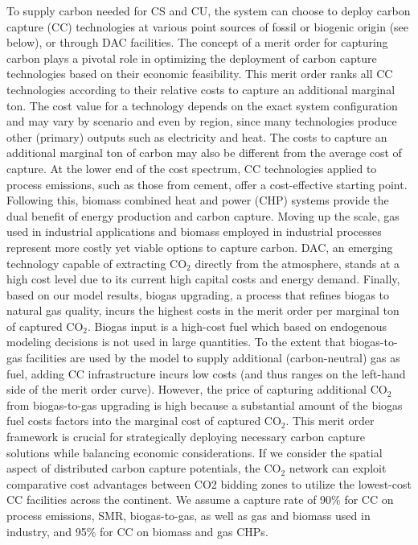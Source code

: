 \documentclass[twocolumn]{article}
\newcommand{\carbon}{CO$_2$}
\begin{document}
To supply carbon needed for CS and CU, the system can choose to deploy carbon capture (CC) technologies at various point sources of fossil or biogenic origin (see below), or through DAC facilities.
The concept of a merit order for capturing carbon plays a pivotal role in optimizing the deployment of carbon capture technologies based on their economic feasibility.
This merit order ranks all CC technologies according to their relative costs to capture an additional marginal ton. The cost value for a technology depends on the exact system configuration and may vary by scenario and even by region, since many technologies produce other (primary) outputs such as electricity and heat. The costs to capture an additional marginal ton of carbon may also be different from the average cost of capture.
At the lower end of the cost spectrum, CC technologies applied to process emissions, such as those from cement, offer a cost-effective starting point.
Following this, biomass combined heat and power (CHP) systems provide the dual benefit of energy production and carbon capture.
Moving up the scale, gas used in industrial applications and biomass employed in industrial processes represent more costly yet viable options to capture carbon.
DAC, an emerging technology capable of extracting \carbon{} directly from the atmosphere, stands at a high cost level due to its current high capital costs and energy demand.
Finally, based on our model results, biogas upgrading, a process that refines biogas to natural gas quality, incurs the highest costs in the merit order per marginal ton of captured \carbon{}.
Biogas input is a high-cost fuel which based on endogenous modeling decisions is not used in large quantities.
To the extent that biogas-to-gas facilities are used by the model to supply additional (carbon-neutral) gas as fuel, adding CC infrastructure incurs low costs (and thus ranges on the left-hand side of the merit order curve).
However, the price of capturing additional \carbon{} from biogas-to-gas upgrading is high because a substantial amount of the biogas fuel costs factors into the marginal cost of captured \carbon{}.
This merit order framework is crucial for strategically deploying necessary carbon capture solutions while balancing economic considerations.
If we consider the spatial aspect of distributed carbon capture potentials, the \carbon{} network can exploit comparative cost advantages between CO2 bidding zones to utilize the lowest-cost CC facilities across the continent.
We assume a capture rate of 90\% for CC on process emissions, SMR, biogas-to-gas, as well as gas and biomass used in industry, and 95\% for CC on biomass and gas CHPs.
\end{document}
